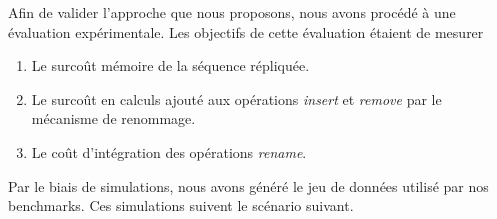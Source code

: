 Afin de valider l'approche que nous proposons, nous avons procédé à une évaluation expérimentale.
Les objectifs de cette évaluation étaient de mesurer
\begin{enumerate}
  \item Le surcoût mémoire de la séquence répliquée.
  \item Le surcoût en calculs ajouté aux opérations \emph{insert} et \emph{remove} par le mécanisme de renommage.
  \item Le coût d'intégration des opérations \emph{rename}.
\end{enumerate}

Par le biais de simulations, nous avons généré le jeu de données utilisé par nos benchmarks.
Ces simulations suivent le scénario suivant.
